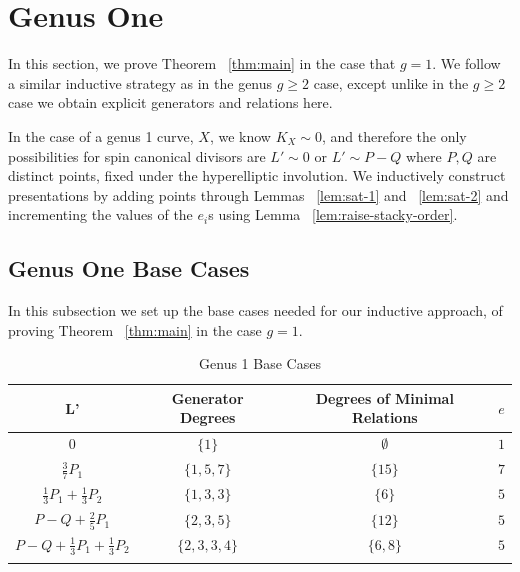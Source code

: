 \documentclass{amsart}
\theoremstyle{plain}
\theoremstyle{definition}
\theoremstyle{remark}
\numberwithin{equation}{section}
\newcommand\ssec{\subsection}
\newcommand{\halfcan}{L}
\begin{document}

\section{Genus One}
\label{sec:g-1}

In this section, we prove Theorem ~\ref{thm:main} in the case that $g = 1$.  We follow a similar inductive strategy as in the genus $g\geq 2$ case, except unlike in the $g \geq 2$ case we obtain explicit generators and relations here.

In the case of a genus 1 curve, $X$, we know $K_X \sim 0$, and therefore the only possibilities for spin canonical divisors are $\halfcan' \sim 0$ or $\halfcan' \sim P - Q$ where $P,Q$ are distinct points, fixed  under the hyperelliptic involution. We inductively construct presentations by adding points through Lemmas ~\ref{lem:sat-1} and ~\ref{lem:sat-2} and incrementing the values of the $e_i$s using Lemma ~\ref{lem:raise-stacky-order}.

\ssec{Genus One Base Cases}
\label{ssec:g-1_base}
In this subsection we set up the base cases needed for our inductive approach, of proving Theorem ~\ref{thm:main} in the case $g = 1$.

\begin{longtable}	{| c || c | c | c |}	
	\hline
	L' & Generator Degrees & Degrees of Minimal Relations & $e$ \\
	\hline
	\hline
	$0$ & $\{1\}$ & $\emptyset$ & $1$ \\	\hline

	$\frac{3}{7} P_1$ & $\{1,5,7\}$ & $\{15\}$ & $7$ \\	\hline
	
	$\frac{1}{3} P_1 + \frac{1}{3} P_2$ & $\{1, 3, 3\}$ & $\{6\}$ & $5$ \\	\hline
	
	$P - Q + \frac{2}{5} P_1$ & $\{2, 3, 5\}$ & $\{12\}$ & $5$ \\	\hline
	
	$P - Q + \frac{1}{3} P_1 + \frac{1}{3}P_2$ & $\{2, 3, 3, 4\}$ & $\{6,8\}$ & $5$ \\	\hline
	
	\caption{Genus 1 Base Cases}
	\label{table:g-1-base}
	
\end{longtable}
\end{document}
